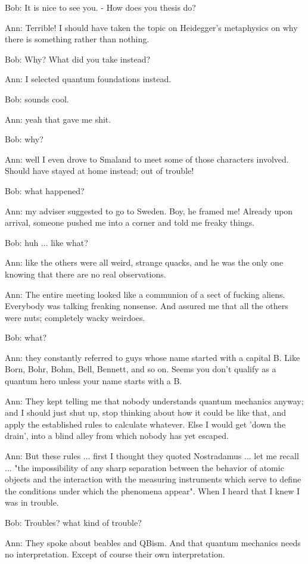 Bob: It is nice to see you. -  How does you thesis do?

Ann: Terrible! I should have taken the topic on Heidegger's metaphysics on why there is something rather than nothing.

Bob: Why? What did you take instead?

Ann: I selected quantum foundations instead.

Bob: sounds cool.

Ann: yeah that gave me shit.

Bob: why?

Ann: well I even drove to Smaland to meet some of those characters involved. Should have stayed at home instead; out of trouble!

Bob: what happened?

Ann: my adviser suggested to go to Sweden. Boy, he framed me! Already upon arrival, someone pushed me into a corner and told me freaky things.

Bob: huh ... like what?

Ann: like the others were all weird, strange quacks, and he was the only one knowing that there are no real observations.

Ann: The entire meeting looked like a communion of a sect of fucking aliens. Everybody was talking freaking nonsense. And assured me that all the others were nuts; completely wacky weirdoes.

Bob: what?

Ann: they constantly referred to guys whose name started with a capital B. Like Born, Bohr, Bohm, Bell, Bennett, and so on. Seems you don't qualify as a quantum hero unless your name starts with a B.

Ann: They kept telling me that nobody understands quantum mechanics anyway; and I should just shut up, stop thinking about how it could be like that,  and apply the established rules to calculate whatever. Else I would get 'down the drain', into a blind alley from which nobody has yet escaped.

Ann: But these rules ... first I thought they quoted Nostradamus   ... let me recall ...  "the impossibility of any sharp separation between the behavior of atomic objects and the interaction with the measuring instruments which serve to define the conditions under which the phenomena appear". When I heard that I knew I was in trouble.

Bob: Troubles? what kind of trouble?

Ann: They spoke about beables and QBism. And that quantum mechanics needs no interpretation. Except of course their own interpretation.

